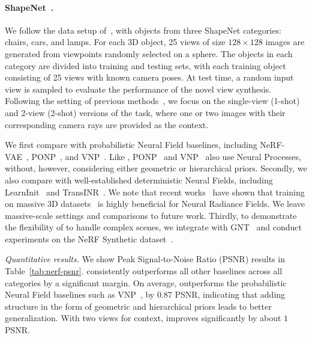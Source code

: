 \paragraph{ShapeNet~\citep{chang2015shapenet}.} 
We follow the data setup of~\citep{tancik2021learned}, with objects from three ShapeNet categories: chairs, cars, and lamps. For each 3D object, 25 views of size \(128 \times 128\) images are generated from viewpoints randomly selected on a sphere.
The objects in each category are divided into training and testing sets, with each training object consisting of 25 views with known camera poses.
At test time, a random input view is sampled to evaluate the performance of the novel view synthesis. Following the setting of previous methods~\citep{chen2022transformers}, we focus on the single-view (1-shot) and 2-view (2-shot) versions of the task, where one or two images with their corresponding camera rays are provided as the context.

We first compare with probabilistic Neural Field baselines, including NeRF-VAE~\citep{kosiorek2021nerf}, PONP~\citep{gu2023generalizable}, and VNP~\citep{guo2023versatile}.
Like \name{}, PONP~\citep{gu2023generalizable} and VNP~\citep{guo2023versatile} also use Neural Processes, without, however, considering either geometric or hierarchical priors.
Secondly, we also compare with well-established deterministic Neural Fields, including LearnInit~\citep{tancik2021learned} and  TransINR~\citep{chen2022transformers}.
We note that recent works~\citep{liu2023zero,shi2023zero123plus} have shown that training on massive 3D datasets~\citep{deitke2023objaverse} is highly beneficial for Neural Radiance Fields.
We leave massive-scale settings and comparisons to future work.
Thirdly, to demonstrate the flexibility of \name{} to handle complex scenes, we integrate with GNT~\citep{wang2022attention} and conduct experiments on the NeRF Synthetic dataset~\citep{mildenhall2021nerf}.



\emph{Quantitative results.} We show Peak Signal-to-Noise Ratio (PSNR) results in Table~\ref{tab:nerf-psnr}.
\name{} consistently outperforms all other baselines across all categories by a significant margin.
On average, \name{} outperforms the probabilistic Neural Field baselines such as VNP~\citep{guo2023versatile}, by 0.87 PSNR, %
indicating that adding structure in the form of geometric and hierarchical priors leads to better generalization. 
With two views for context, \name{} improves significantly by about $1$ PSNR.

